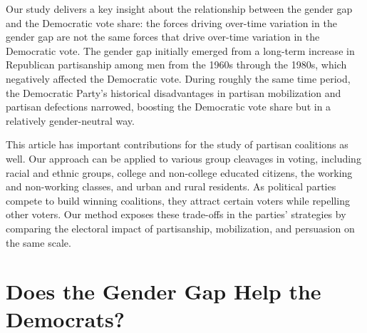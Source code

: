 \documentclass[12pt
               ,final
               ]{article}
\begin{document}

Our study delivers a key insight about the relationship between the gender gap and the Democratic vote share: the forces driving over-time variation in the gender gap are not the same forces that drive over-time variation in the Democratic vote. The gender gap initially emerged from a long-term increase in Republican partisanship among men from the 1960s through the 1980s, which negatively affected the Democratic vote. 
During roughly the same time period, the Democratic Party's historical disadvantages in partisan mobilization and partisan defections narrowed, boosting the Democratic vote share but in a relatively gender-neutral way. 


This article has important contributions for the study of partisan coalitions as well. Our approach can be applied to various group cleavages in voting, including racial and ethnic groups, college and non-college educated citizens, the working and non-working classes, and urban and rural residents. As political parties compete to build winning coalitions, they attract certain voters while repelling other voters. Our method exposes these trade-offs in the parties' strategies by comparing the electoral impact of partisanship, mobilization, and persuasion on the same scale. 





\section*{Does the Gender Gap Help the Democrats?}
\label{sec:topline}
\end{document}

